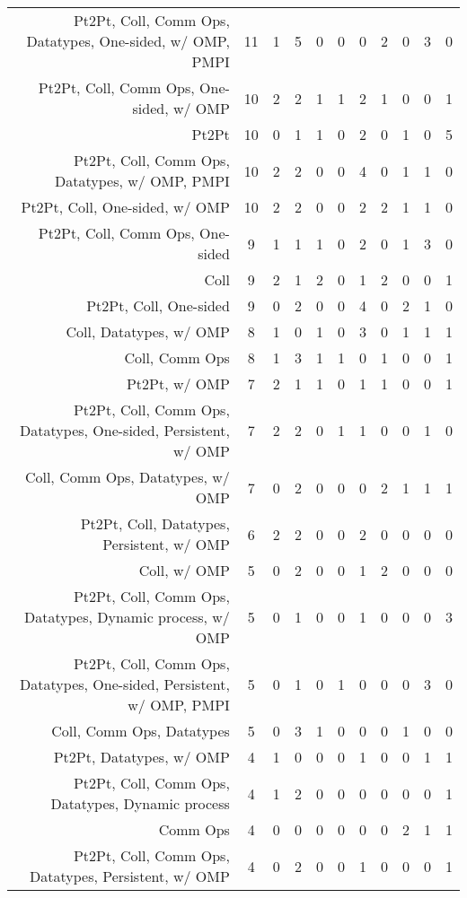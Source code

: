 {\begin{landscape}
\begin{longtable}[htb]{r|c|c|c|c|c|c|c|c|c|c}
{Pt2Pt, Coll, Comm Ops, Datatypes, One-sided, w/ OMP, PMPI} & 11 & 1 & 5 & 0 & 0 & 0 & 2 & 0 & 3 & 0 \\%
{Pt2Pt, Coll, Comm Ops, One-sided, w/ OMP} & 10 & 2 & 2 & 1 & 1 & 2 & 1 & 0 & 0 & 1 \\%
{Pt2Pt} & 10 & 0 & 1 & 1 & 0 & 2 & 0 & 1 & 0 & 5 \\%
{Pt2Pt, Coll, Comm Ops, Datatypes, w/ OMP, PMPI} & 10 & 2 & 2 & 0 & 0 & 4 & 0 & 1 & 1 & 0 \\%
{Pt2Pt, Coll, One-sided, w/ OMP} & 10 & 2 & 2 & 0 & 0 & 2 & 2 & 1 & 1 & 0 \\%
{Pt2Pt, Coll, Comm Ops, One-sided} & 9 & 1 & 1 & 1 & 0 & 2 & 0 & 1 & 3 & 0 \\%
{Coll} & 9 & 2 & 1 & 2 & 0 & 1 & 2 & 0 & 0 & 1 \\%
{Pt2Pt, Coll, One-sided} & 9 & 0 & 2 & 0 & 0 & 4 & 0 & 2 & 1 & 0 \\%
{Coll, Datatypes, w/ OMP} & 8 & 1 & 0 & 1 & 0 & 3 & 0 & 1 & 1 & 1 \\%
{Coll, Comm Ops} & 8 & 1 & 3 & 1 & 1 & 0 & 1 & 0 & 0 & 1 \\%
{Pt2Pt, w/ OMP} & 7 & 2 & 1 & 1 & 0 & 1 & 1 & 0 & 0 & 1 \\%
{Pt2Pt, Coll, Comm Ops, Datatypes, One-sided, Persistent, w/ OMP} & 7 & 2 & 2 & 0 & 1 & 1 & 0 & 0 & 1 & 0 \\%
{Coll, Comm Ops, Datatypes, w/ OMP} & 7 & 0 & 2 & 0 & 0 & 0 & 2 & 1 & 1 & 1 \\%
{Pt2Pt, Coll, Datatypes, Persistent, w/ OMP} & 6 & 2 & 2 & 0 & 0 & 2 & 0 & 0 & 0 & 0 \\%
{Coll, w/ OMP} & 5 & 0 & 2 & 0 & 0 & 1 & 2 & 0 & 0 & 0 \\%
{Pt2Pt, Coll, Comm Ops, Datatypes, Dynamic process, w/ OMP} & 5 & 0 & 1 & 0 & 0 & 1 & 0 & 0 & 0 & 3 \\%
{Pt2Pt, Coll, Comm Ops, Datatypes, One-sided, Persistent, w/ OMP, PMPI} & 5 & 0 & 1 & 0 & 1 & 0 & 0 & 0 & 3 & 0 \\%
{Coll, Comm Ops, Datatypes} & 5 & 0 & 3 & 1 & 0 & 0 & 0 & 1 & 0 & 0 \\%
{Pt2Pt, Datatypes, w/ OMP} & 4 & 1 & 0 & 0 & 0 & 1 & 0 & 0 & 1 & 1 \\%
{Pt2Pt, Coll, Comm Ops, Datatypes, Dynamic process} & 4 & 1 & 2 & 0 & 0 & 0 & 0 & 0 & 0 & 1 \\%
{Comm Ops} & 4 & 0 & 0 & 0 & 0 & 0 & 0 & 2 & 1 & 1 \\%
{Pt2Pt, Coll, Comm Ops, Datatypes, Persistent, w/ OMP} & 4 & 0 & 2 & 0 & 0 & 1 & 0 & 0 & 0 & 1 \\%

\end{longtable}
\end{landscape}}
